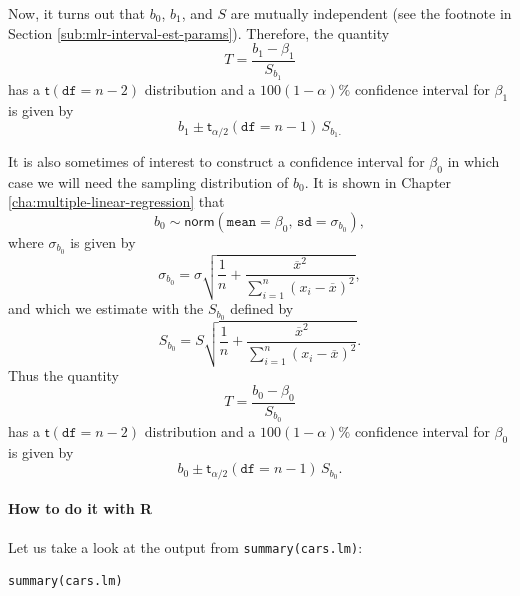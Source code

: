 \documentclass[captions=tableheading]{scrbook}
\begin{document}
Now, it turns out that \(b_{0}\), \(b_{1}\), and \(S\) are mutually independent (see the footnote in Section \ref{sub:mlr-interval-est-params}). Therefore, the quantity
\begin{equation}
T=\frac{b_{1}-\beta_{1}}{S_{b_{1}}}
\end{equation}
has a \(\mathsf{t}(\mathtt{df}=n-2)\) distribution and a \(100(1 - \alpha)\% \) confidence interval for \(\beta_{1}\) is given by 
\begin{equation}
b_{1}\pm\mathsf{t}_{\alpha/2}(\mathtt{df}=n-1)\, S_{b_{1}.}
\end{equation}

It is also sometimes of interest to construct a confidence interval for \(\beta_{0}\) in which case we will need the sampling distribution of \(b_{0}\). It is shown in Chapter \ref{cha:multiple-linear-regression} that
\begin{equation}
b_{0}\sim\mathsf{norm}\left(\mathtt{mean}=\beta_{0},\,\mathtt{sd}=\sigma_{b_{0}}\right),
\end{equation}
where \(\sigma_{b_{0}}\) is given by
\begin{equation}
\sigma_{b_{0}}=\sigma\sqrt{\frac{1}{n}+\frac{\overline{x}^{2}}{\sum_{i=1}^{n}(x_{i}-\overline{x})^{2}}},
\end{equation}
and which we estimate with the \(S_{b_{0}}\) defined by
\begin{equation}
S_{b_{0}}=S\sqrt{\frac{1}{n}+\frac{\overline{x}^{2}}{\sum_{i=1}^{n}(x_{i}-\overline{x})^{2}}}.
\end{equation}
Thus the quantity
\begin{equation}
T=\frac{b_{0}-\beta_{0}}{S_{b_{0}}}
\end{equation}
has a \(\mathsf{t}(\mathtt{df}=n-2)\) distribution and a \(100(1-\alpha)\%\) confidence interval for \(\beta_{0}\) is given by
\begin{equation}
b_{0}\pm\mathsf{t}_{\alpha/2}(\mathtt{df}=n-1)\, S_{b_{0}}.
\end{equation}

\paragraph*{How to do it with \textsf{R}}



Let us take a look at the output from \texttt{summary(cars.lm)}:


\begin{verbatim}
summary(cars.lm)
\end{verbatim}
\end{document}
